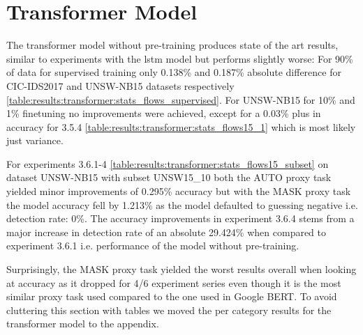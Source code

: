 

\FloatBarrier

\section{Transformer Model} \label{sec:results:transformer}



The transformer model without pre-training produces state of the art results, similar to experiments with the \gls{lstm} model but  performs slightly worse: For 90\% of data for supervised training only 0.138\% and 0.187\% absolute difference for CIC-IDS2017 and UNSW-NB15 datasets respectively \ref{table:results:transformer:stats_flows_supervised}.
For UNSW-NB15 for 10\% and 1\% finetuning no improvements were achieved, except for a 0.03\% plus in accuracy for 3.5.4 \ref{table:results:transformer:stats_flows15_1} which is most likely just variance. \par



For experiments 3.6.1-4 \ref{table:results:transformer:stats_flows15_subset} on dataset UNSW-NB15 with subset UNSW15\_10 both the AUTO proxy task yielded minor improvements of 0.295\% accuracy but with the MASK proxy task the model accuracy fell by 1.213\% as the model defaulted to guessing negative i.e. detection rate: 0\%. The accuracy improvements in experiment 3.6.4 stems from a major increase in detection rate of an absolute 29.424\% when compared to experiment 3.6.1 i.e. performance of the model without pre-training. \par
Surprisingly, the MASK proxy task yielded the worst results overall when looking at accuracy as it dropped for 4/6 experiment series even though it is the most similar proxy task used compared to the one used in Google BERT. To avoid cluttering this section with tables we moved the per category results for the transformer model to the appendix.








